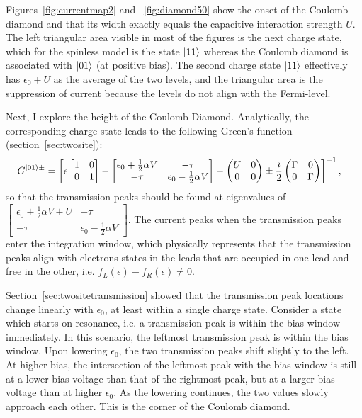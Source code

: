 Figures~\ref{fig:currentmap2} and ~\ref{fig:diamond50} show the onset of the Coulomb diamond and that its width exactly equals the capacitive interaction strength $U$. The left triangular area visible in most of the figures is the next charge state, which for the spinless model is the state $\ket{11}$ whereas the Coulomb diamond is associated with $\ket{01}$ (at positive bias). The second charge state $\ket{11}$ effectively has $\epsilon_0+U$ as the average of the two levels, and the triangular area is the suppression of current because the levels do not align with the Fermi-level.

Next, I explore the height of the Coulomb Diamond. Analytically, the corresponding charge state leads to the following Green's function (section~\ref{sec:twosite}):
\begin{align*}
G^{\ket{01}\pm} &= \left[ \epsilon \begin{bmatrix} 1 & 0 \\ 0 & 1 \end{bmatrix} - \begin{bmatrix} \epsilon_0 + \frac{1}{2} \alpha V & -\tau \\
-\tau & \epsilon_0 - \frac{1}{2} \alpha V\end{bmatrix} - \begin{pmatrix} U & 0 \\ 0 & 0 \end{pmatrix} \pm \frac{\imath}{2} \begin{pmatrix} \Gamma & 0 \\ 0 & \Gamma \end{pmatrix} \right]^{-1},
\end{align*}
so that the transmission peaks should be found at eigenvalues of $\begin{bmatrix} \epsilon_0 + \frac{1}{2} \alpha V+U & -\tau \\
-\tau & \epsilon_0 - \frac{1}{2} \alpha V\end{bmatrix}$. The current peaks when the transmission peaks enter the integration window, which physically represents that the transmission peaks align with electrons states in the leads that are occupied in one lead and free in the other, i.e. $f_L(\epsilon) - f_R(\epsilon) \neq 0$.

Section~\ref{sec:twositetransmission} showed that the transmission peak locations change linearly with $\epsilon_0$, at least within a single charge state. Consider a state which starts on resonance, i.e. a transmission peak is within the bias window immediately. In this scenario, the leftmost transmission peak is within the bias window. Upon lowering $\epsilon_0$, the two transmission peaks shift slightly to the left. At higher bias, the intersection of the leftmost peak with the bias window is still at a lower bias voltage than that of the rightmost peak, but at a larger bias voltage than at higher $\epsilon_0$. As the lowering continues, the two values slowly approach each other. This is the corner of the Coulomb diamond.

